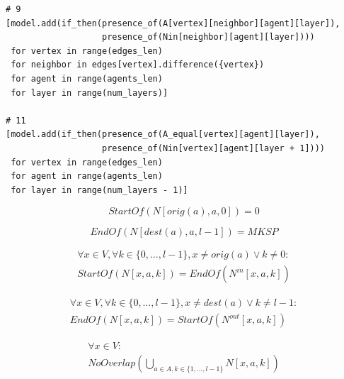 \documentclass[12pt, a4paper, hidelinks]{article}
\numberwithin{equation}{section}
\begin{document}
\begin{lstlisting}[label={lst:eq2.9and2.11}]
# 9
[model.add(if_then(presence_of(A[vertex][neighbor][agent][layer]),
                   presence_of(Nin[neighbor][agent][layer])))
 for vertex in range(edges_len)
 for neighbor in edges[vertex].difference({vertex})
 for agent in range(agents_len)
 for layer in range(num_layers)]

# 11
[model.add(if_then(presence_of(A_equal[vertex][agent][layer]),
                   presence_of(Nin[vertex][agent][layer + 1])))
 for vertex in range(edges_len)
 for agent in range(agents_len)
 for layer in range(num_layers - 1)]
\end{lstlisting}

\begin{description}\label{eq:equation_set_2.4}
\item \begin{equation} StartOf(N[orig(a),a,0]) = 0 \label{eq:2.13}\end{equation}
\item \begin{equation} EndOf(N[dest(a),a,l-1]) = MKSP \label{eq:2.14}\end{equation}
\item \begin{equation}\begin{split} \forall x \in V, \forall k \in \{0,\dots,l-1\}, x \neq orig(a) \lor k \neq 0: \\ StartOf(N[x,a,k]) = EndOf(N^{in}[x,a,k]) \end{split}\label{eq:2.15}\end{equation}
\item \begin{equation}\begin{split} \forall x \in V, \forall k \in \{0,\dots,l-1\}, x \neq dest(a) \lor k \neq l-1: \\ EndOf(N[x,a,k]) = StartOf(N^{out}[x,a,k]) \end{split}\label{eq:2.16}\end{equation}
\item \begin{equation}\begin{split} \forall x \in V: \\ NoOverlap(\bigcup_{a \in A, k \in \{1,\dots,l-1\}} N[x,a,k])\end{split}\label{eq:2.17}\end{equation}
\end{description}
\end{document}
